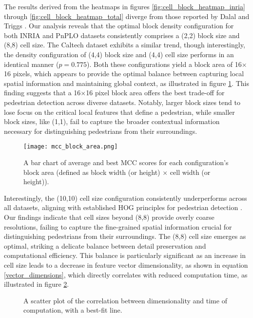 The results derived from the heatmaps in figures \ref{fig:cell_block_heatmap_inria} through \ref{fig:cell_block_heatmap_total} diverge from those reported by Dalal and Triggs \cite{dalal_2005_histograms}. Our analysis reveals that the optimal block density configuration for both INRIA and PnPLO datasets consistently comprises a (2,2) block size and (8,8) cell size. The Caltech dataset exhibits a similar trend, though interestingly, the density configuration of (4,4) block size and (4,4) cell size performs in an identical manner ($p=0.775$). Both these configurations yield a block area of 16$\times$16 pixels, which appears to provide the optimal balance between capturing local spatial information and maintaining global context, as illustrated in figure \ref{fig:block_area}. This finding suggests that a 16$\times$16 pixel block area offers the best trade-off for pedestrian detection across diverse datasets. Notably, larger block sizes tend to lose focus on the critical local features that define a pedestrian, while smaller block sizes, like (1,1), fail to capture the broader contextual information necessary for distinguishing pedestrians from their surroundings. 

\begin{figure}
    \texttt{[image: mcc\_block\_area.png]}
    \caption{
        A bar chart of average and best MCC scores for each configuration's block area (defined as block width (or height) $\times$ cell width (or height)). 
    }
    \label{fig:block_area}
\end{figure}

Interestingly, the (10,10) cell size configuration consistently underperforms across all datasets, aligning with established HOG principles for pedestrian detection \cite{dalal_2005_histograms}. Our findings indicate that cell sizes beyond (8,8) provide overly coarse resolutions, failing to capture the fine-grained spatial information crucial for distinguishing pedestrians from their surroundings. The (8,8) cell size emerges as optimal, striking a delicate balance between detail preservation and computational efficiency. This balance is particularly significant as an increase in cell size leads to a decrease in feature vector dimensionality, as shown in equation \ref{vector_dimensions}, which directly correlates with reduced computation time, as illustrated in figure \ref{fig:correlation_with_best_fit}. 

\begin{figure}
    
    \caption{
        A scatter plot of the correlation between dimensionality and time of computation, with a best-fit line.
    }
    \label{fig:correlation_with_best_fit}
\end{figure}


